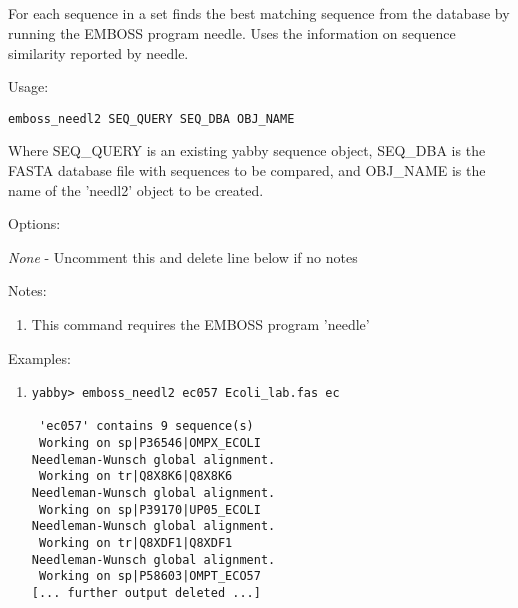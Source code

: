 


\subsection[emboss\_needl2]{  }



For each sequence in a set finds the best matching sequence
from the database by running the EMBOSS program needle.
Uses the information on sequence similarity reported by
needle.


\begin{description}


\item{Usage:}

{\tt emboss\_needl2 SEQ\_QUERY SEQ\_DBA OBJ\_NAME}

Where SEQ\_QUERY is an existing yabby sequence object, SEQ\_DBA
is the FASTA database file with sequences to be compared, and
OBJ\_NAME is the name of the 'needl2' object to be created.


\item{Options:}
\begin{description}
{\em None} - Uncomment this and delete line below if no notes
\end{description}


\item{Notes:}
\begin{enumerate}
\item This command requires the EMBOSS program 'needle'
\end{enumerate}


\item{Examples:}
\begin{enumerate}

\item
\begin{verbatim}
yabby> emboss_needl2 ec057 Ecoli_lab.fas ec

 'ec057' contains 9 sequence(s)
 Working on sp|P36546|OMPX_ECOLI
Needleman-Wunsch global alignment.
 Working on tr|Q8X8K6|Q8X8K6
Needleman-Wunsch global alignment.
 Working on sp|P39170|UP05_ECOLI
Needleman-Wunsch global alignment.
 Working on tr|Q8XDF1|Q8XDF1
Needleman-Wunsch global alignment.
 Working on sp|P58603|OMPT_ECO57
[... further output deleted ...]
\end{verbatim}


\end{enumerate}
\end{description}
